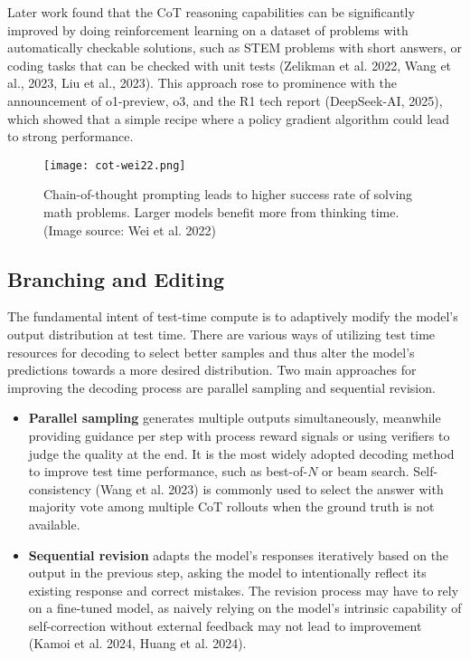 \documentclass[12pt]{article}
\begin{document}
Later work found that the CoT reasoning capabilities can be significantly improved by doing reinforcement learning on a dataset of problems with automatically checkable solutions, such as STEM problems with short answers, or coding tasks that can be checked with unit tests (Zelikman et al. 2022, Wang et al., 2023, Liu et al., 2023). This approach rose to prominence with the announcement of o1-preview, o3, and the R1 tech report (DeepSeek-AI, 2025), which showed that a simple recipe where a policy gradient algorithm could lead to strong performance.

\begin{figure}[h]
    \centering
    \texttt{[image: cot-wei22.png]}
    \caption{Chain-of-thought prompting leads to higher success rate of solving math problems. Larger models benefit more from thinking time. (Image source: Wei et al. 2022)}
\end{figure}

\subsection{Branching and Editing}

The fundamental intent of test-time compute is to adaptively modify the model’s output distribution at test time. There are various ways of utilizing test time resources for decoding to select better samples and thus alter the model’s predictions towards a more desired distribution. Two main approaches for improving the decoding process are parallel sampling and sequential revision.

\begin{itemize}
    \item \textbf{Parallel sampling} generates multiple outputs simultaneously, meanwhile providing guidance per step with process reward signals or using verifiers to judge the quality at the end. It is the most widely adopted decoding method to improve test time performance, such as best-of-$N$ or beam search. Self-consistency (Wang et al. 2023) is commonly used to select the answer with majority vote among multiple CoT rollouts when the ground truth is not available.
    \item \textbf{Sequential revision} adapts the model’s responses iteratively based on the output in the previous step, asking the model to intentionally reflect its existing response and correct mistakes. The revision process may have to rely on a fine-tuned model, as naively relying on the model’s intrinsic capability of self-correction without external feedback may not lead to improvement (Kamoi et al. 2024, Huang et al. 2024).
\end{itemize}
\end{document}
